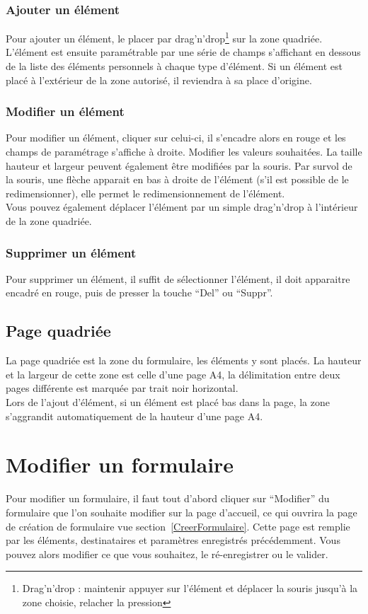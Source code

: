 \documentclass[a4paper,11pt,final]{report}
\begin{document}
\subsubsection{Ajouter un élément}
Pour ajouter un élément, le placer par drag'n'drop\footnote{Drag'n'drop : maintenir appuyer sur l'élément et déplacer la souris jusqu'à la zone choisie, relacher la pression} sur la zone quadriée.\\ 
L'élément est ensuite paramétrable par une série de champs s'affichant en dessous de la liste des éléments personnels à chaque type d'élément.
Si un élément est placé à l'extérieur de la zone autorisé, il reviendra à sa place d'origine.

\subsubsection{Modifier un élément}
Pour modifier un élément, cliquer sur celui-ci, il s'encadre alors en rouge et les champs de paramétrage s'affiche à droite. Modifier les valeurs souhaitées. La taille hauteur et largeur peuvent également être modifiées par la souris. Par survol de la souris, une flèche apparait en bas à droite de l'élément (s'il est possible de le redimensionner), elle permet le redimensionnement de l'élément.\\
Vous pouvez également déplacer l'élément par un simple drag'n'drop à l'intérieur de la zone quadriée.

\subsubsection{Supprimer un élément}
Pour supprimer un élément, il suffit de sélectionner l'élément, il doit apparaitre encadré en rouge, puis de presser la touche ``Del'' ou ``Suppr''.

\subsection{Page quadriée}
La page quadriée est la zone du formulaire, les éléments y sont placés. La hauteur et la largeur de cette zone est celle d'une page A4, la délimitation entre deux pages différente est marquée par trait noir horizontal.\\
Lors de l'ajout d'élément, si un élément est placé bas dans la page, la zone s'aggrandit automatiquement de la hauteur d'une page A4. 

\section{Modifier un formulaire}
Pour modifier un formulaire, il faut tout d'abord cliquer sur ``Modifier'' du formulaire que l'on souhaite modifier sur la page d'accueil, ce qui ouvrira la page de création de formulaire vue section~\ref{CreerFormulaire}. Cette page est remplie par les éléments, destinataires et paramètres enregistrés précédemment. Vous pouvez alors modifier ce que vous souhaitez, le ré-enregistrer ou le valider.
\end{document}
